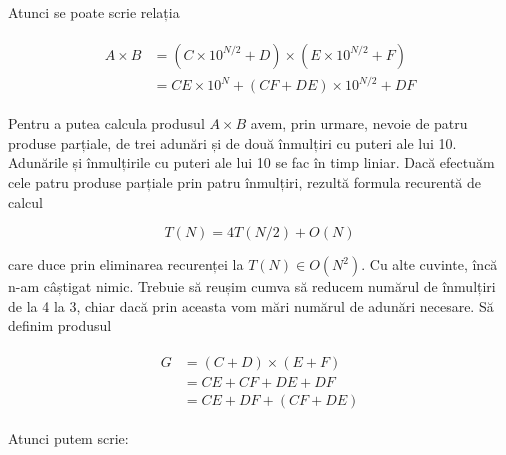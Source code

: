 
Atunci se poate scrie relația

\begin{align}
  \begin{split}
    A \times B & = (C \times 10^{N / 2} + D) \times (E \times 10^{N / 2} + F) \\
    & = CE \times 10^{N} + (CF + DE) \times 10^{N / 2} + DF
  \end{split}
\end{align}

Pentru a putea calcula produsul $A \times B$ avem, prin urmare, nevoie de
patru produse parțiale, de trei adunări și de două înmulțiri cu puteri ale lui
10. Adunările și înmulțirile cu puteri ale lui 10 se fac în timp liniar. Dacă
efectuăm cele patru produse parțiale prin patru înmulțiri, rezultă formula
recurentă de calcul

\begin{equation}
  T(N) = 4 T(N / 2) + O(N)
\end{equation}

care duce prin eliminarea recurenței la $T(N) \in O(N^2)$. Cu alte cuvinte,
încă n-am câștigat nimic. Trebuie să reușim cumva să reducem numărul de
înmulțiri de la 4 la 3, chiar dacă prin aceasta vom mări numărul de adunări
necesare. Să definim produsul

\begin{align}
  \begin{split}
    G & = (C + D) \times (E + F) \\
    & = CE + CF + DE + DF \\
    & = CE + DF + (CF + DE)
  \end{split}
\end{align}

Atunci putem scrie:

